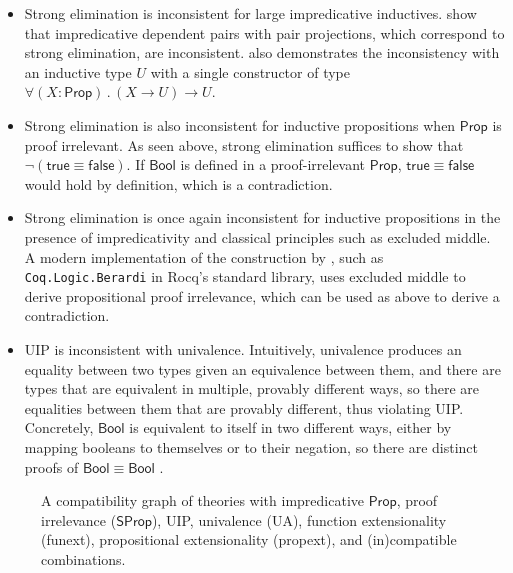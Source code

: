 \documentclass{article}
\newcommand{\kw}[1]{\mathsf{#1}}
\newcommand{\code}[1]{\texttt{#1}}
\begin{document}
\begin{itemize}[noitemsep,topsep=0pt]
  \item Strong elimination is inconsistent for large impredicative inductives.
    \citet{strong-pair} show that impredicative dependent pairs with pair projections,
    which correspond to strong elimination, are inconsistent.
    \citet{trees} also demonstrates the inconsistency with an inductive type $U$
    with a single constructor of type
    $\forall (X : \kw{Prop})\mathpunct{.} (X \to U) \to U$.
  \item Strong elimination is also inconsistent for inductive propositions
    when $\kw{Prop}$ is proof irrelevant.
    As seen above, strong elimination suffices to show that $\neg (\kw{true} \equiv \kw{false})$.
    If $\kw{Bool}$ is defined in a proof-irrelevant $\kw{Prop}$,
    $\kw{true} \equiv \kw{false}$ would hold by definition,
    which is a contradiction.
  \item Strong elimination is once again inconsistent for inductive propositions
    in the presence of impredicativity and classical principles such as excluded middle.
    A modern implementation of the construction by \cite{em-irr},
    such as \code{Coq.Logic.Berardi} in Rocq's standard library,
    uses excluded middle to derive propositional proof irrelevance,
    which can be used as above to derive a contradiction.
  \item UIP is inconsistent with univalence.
    Intuitively, univalence produces an equality between two types
    given an equivalence between them,
    and there are types that are equivalent in multiple, provably different ways,
    so there are equalities between them that are provably different,
    thus violating UIP.
    Concretely, $\kw{Bool}$ is equivalent to itself in two different ways,
    either by mapping booleans to themselves or to their negation,
    so there are distinct proofs of $\kw{Bool} \equiv \kw{Bool}$
    \citep[Example 3.1.9]{hott}.
\end{itemize}

\begin{figure}[ht]
\centering
{}
\caption{A compatibility graph of theories with impredicative $\kw{Prop}$, proof irrelevance ($\kw{SProp}$),
  UIP, univalence (UA), function extensionality (funext), propositional extensionality (propext),
  and (in)compatible combinations.}
\label{fig:lattice}
\end{figure}
\end{document}
